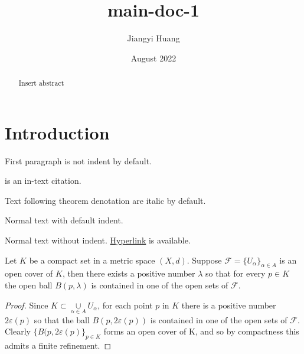 \documentclass{article}
\title{main-doc-1}
\author{Jiangyi Huang}
\date{August 2022}
\begin{document}
\maketitle

\begin{abstract}
Insert abstract
\end{abstract}


\section{Introduction}

First paragraph is not indent by default.

\mydef \cite{einstein} is an in-text citation.

Text following theorem denotation are italic by default.

\rm Normal text with default indent.

\noindent \rm Normal text without indent. \href{https://www.overleaf.com/learn/latex/Hyperlinks}{Hyperlink} is available. 

\thm Let $K$ be a compact set in a metric space $(X,d)$. Suppose $\mathcal{F}=\{U_\alpha\}_{\alpha \in A}$ is an open cover of $K$, then there exists a positive number $\lambda$ so that for every $p \in K$ the open ball $B(p,\lambda)$ is contained in one of the open sets of $\mathcal{F}$.

\begin{proof}

Since $K \subset \underset{\alpha \in A}\cup U_\alpha$, for each point $p$ in $K$ there is a positive number $2\varepsilon(p)$ so that the ball $B(p,2\varepsilon(p))$ is contained in one of the open sets of $\mathcal{F}$. Clearly $\{B(p,2\varepsilon(p)\}_{p \in K}$ forms an open cover of K, and so by compactness this admits a finite refinement.

\end{proof}

\newpage


\end{document}
